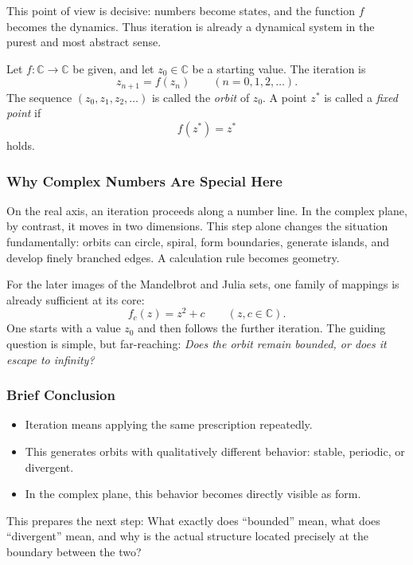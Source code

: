 This point of view is decisive:
numbers become states,
and the function $f$ becomes the dynamics.
Thus iteration is already a dynamical system
in the purest and most abstract sense.

\begin{MathBox}
	\label{box:orbit}
	Let $f:\mathbb{C}\to\mathbb{C}$ be given, and let $z_0\in\mathbb{C}$ be a starting value.
	The iteration is
	\[
	z_{n+1}=f(z_n)\qquad (n=0,1,2,\dots).
	\]
	The sequence $(z_0,z_1,z_2,\dots)$ is called the \emph{orbit} of $z_0$.
	A point $z^\ast$ is called a \emph{fixed point} if
	\[
	f(z^\ast)=z^\ast
	\]
	holds.
\end{MathBox}

\subsubsection*{Why Complex Numbers Are Special Here}

On the real axis, an iteration proceeds along a number line.
In the complex plane, by contrast, it moves in two dimensions.
This step alone changes the situation fundamentally:
orbits can circle,
spiral,
form boundaries,
generate islands,
and develop finely branched edges.
A calculation rule becomes geometry.

For the later images of the Mandelbrot and Julia sets,
one family of mappings is already sufficient at its core:
\[
f_c(z)=z^2+c \qquad (z,c\in\mathbb{C}).
\]
One starts with a value $z_0$
and then follows the further iteration.
The guiding question is simple,
but far-reaching:
\emph{Does the orbit remain bounded, or does it escape to infinity?}

\subsubsection*{Brief Conclusion}

\begin{itemize}
	\item Iteration means applying the same prescription repeatedly.
	\item This generates orbits with qualitatively different behavior: stable, periodic, or divergent.
	\item In the complex plane, this behavior becomes directly visible as form.
\end{itemize}

This prepares the next step:
What exactly does ``bounded'' mean,
what does ``divergent'' mean,
and why is the actual structure located precisely at the boundary between the two?

